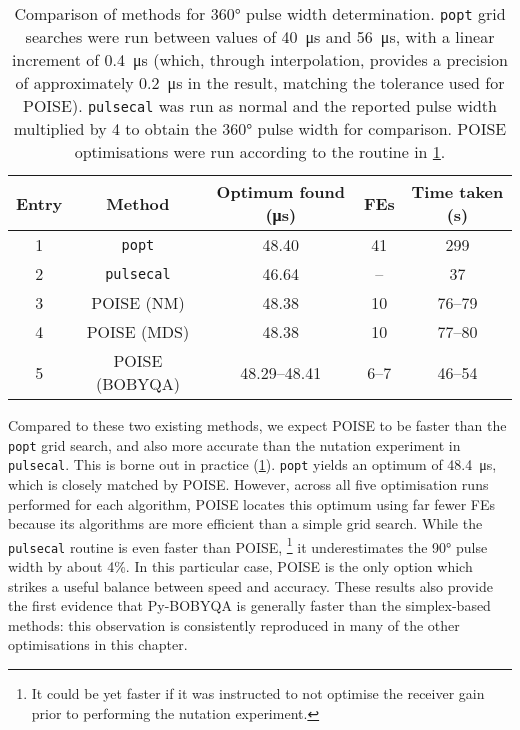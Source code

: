 \begin{table}[!ht]
    \centering
    \begin{tabular}{ccccc}
        \toprule
        Entry & Method & Optimum found (\unit{\us}) & FEs & Time taken (\unit{\s}) \\
        \midrule
        1  & \texttt{popt}      & 48.40        & 41   & 299    \\
        2  & \texttt{pulsecal}  & 46.64        & --   & 37     \\
        3 & POISE (NM)         & 48.38        & 10   & 76--79 \\
        4 & POISE (MDS)        & 48.38        & 10   & 77--80 \\
        5 & POISE (BOBYQA)  & 48.29--48.41 & 6--7 & 46--54 \\
        \bottomrule
    \end{tabular}
    \caption[Comparison of methods for \ang{360} pulse width determination]{
        Comparison of methods for \ang{360} pulse width determination.
        \texttt{popt} grid searches were run between values of \qty{40}{\us} and \qty{56}{\us}, with a linear increment of \qty{0.4}{\us} (which, through interpolation, provides a precision of approximately \qty{0.2}{\us} in the result, matching the tolerance used for POISE).
        \texttt{pulsecal} was run as normal and the reported pulse width multiplied by 4 to obtain the \ang{360} pulse width for comparison.
        POISE optimisations were run according to the routine in \cref{tbl:poisecal_48}.
    }
    \label{tbl:poisecal_48}
\end{table}

Compared to these two existing methods, we expect POISE to be faster than the \texttt{popt} grid search, and also more accurate than the nutation experiment in \texttt{pulsecal}.
This is borne out in practice (\cref{tbl:poisecal_48}).
\texttt{popt} yields an optimum of \qty{48.4}{\us}, which is closely matched by POISE.
However, across all five optimisation runs performed for each algorithm, POISE locates this optimum using far fewer FEs because its algorithms are more efficient than a simple grid search.
While the \texttt{pulsecal} routine is even faster than POISE,%
\footnote{It could be yet faster if it was instructed to not optimise the receiver gain prior to performing the nutation experiment.}
it underestimates the \ang{90} pulse width by about 4\%.
In this particular case, POISE is the only option which strikes a useful balance between speed and accuracy.
These results also provide the first evidence that Py-BOBYQA is generally faster than the simplex-based methods: this observation is consistently reproduced in many of the other optimisations in this chapter.


